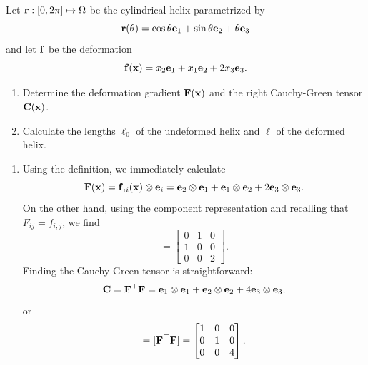 \begin{exercise}
	Let $\mathbf{r} : [0,2\pi] \mapsto \Omega$ be the cylindrical helix parametrized by
	\begin{equation}
		\mathbf{r}(\theta) = \cos\theta \mathbf{e}_1 + \sin\theta \mathbf{e}_2 + \theta \mathbf{e}_3
	\end{equation}
	and let $\mathbf{f}$ be the deformation
	\begin{equation}
		\mathbf{f}(\mathbf{x}) = x_2 \mathbf{e}_1 + x_1 \mathbf{e}_2 + 2x_3 \mathbf{e}_3.
	\end{equation}
	\begin{enumerate}
		\item Determine the deformation gradient $\mathbf{F}(\mathbf{x})$ and the right Cauchy-Green tensor $\mathbf{C}(\mathbf{x})$.
		\item Calculate the lengths $\ell_0$ of the undeformed helix and $\ell$ of the deformed helix.
	\end{enumerate}
	
	\begin{svolgimento}
		\begin{enumerate}
			\item Using the definition, we immediately calculate
			\begin{equation}
				\mathbf{F}(\mathbf{x}) = \mathbf{f}{,_i}(\mathbf{x}) \otimes \mathbf{e}_i = \mathbf{e}_2 \otimes \mathbf{e}_1 + \mathbf{e}_1 \otimes \mathbf{e}_2 + 2\mathbf{e}_3 \otimes \mathbf{e}_3.
			\end{equation}  
			On the other hand, using the component representation and recalling that $F_{ij} = f_{i,j}$, we find
			\begin{equation}
				[\Fb] = \left[
				\begin{matrix}
					0 & 1 & 0 \\
					1 & 0 & 0 \\
					0 & 0 & 2
				\end{matrix}
				\right].
			\end{equation}
			Finding the Cauchy-Green tensor is straightforward:
			\begin{equation}
				\mathbf{C} = \mathbf{F}^\top \mathbf{F} = \mathbf{e}_1 \otimes \mathbf{e}_1 + \mathbf{e}_2 \otimes \mathbf{e}_2 + 4 \mathbf{e}_3 \otimes \mathbf{e}_3,
			\end{equation}
			or
			\begin{equation}
				[\Cb] = [\Fb^\top \Fb] = \left[
				\begin{matrix}
					1 & 0 & 0 \\
					0 & 1 & 0 \\
					0 & 0 & 4
				\end{matrix}
				\right].
			\end{equation}
			

\end{enumerate}
\end{svolgimento}
\end{exercise}
